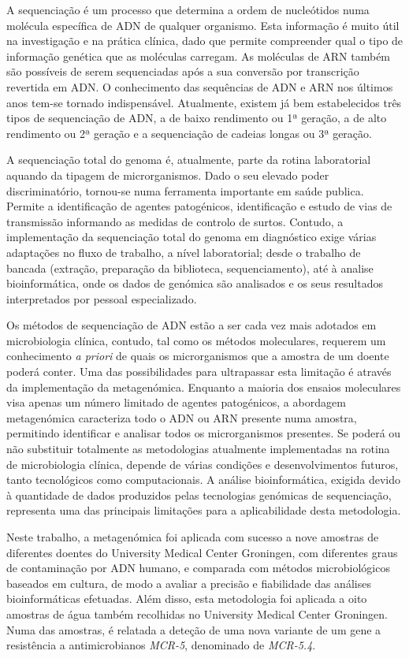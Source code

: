 A sequenciação é um processo que determina a ordem de nucleótidos numa molécula específica de ADN de qualquer organismo. Esta informação é muito útil na investigação e na prática clínica, dado que permite compreender qual o tipo de informação genética que as moléculas carregam. As moléculas de ARN também são possíveis de serem sequenciadas após a sua conversão por transcrição revertida em ADN. O conhecimento das sequências de ADN e ARN nos últimos anos tem-se tornado indispensável. Atualmente, existem já bem estabelecidos três tipos de sequenciação de ADN, a de baixo rendimento ou 1ª geração, a de alto rendimento ou 2ª geração e a sequenciação de cadeias longas ou 3ª geração.

A sequenciação total do genoma é, atualmente, parte da rotina laboratorial aquando da tipagem de microrganismos. Dado o seu elevado poder discriminatório, tornou-se numa ferramenta importante em saúde publica. Permite a identificação de agentes patogénicos, identificação e estudo de vias de transmissão informando as medidas de controlo de surtos. Contudo, a implementação da sequenciação total do genoma em diagnóstico exige várias adaptações no fluxo de trabalho, a nível laboratorial; desde o trabalho de bancada (extração, preparação da biblioteca, sequenciamento), até à analise bioinformática, onde os dados de genómica são analisados e os seus resultados interpretados por pessoal especializado.

Os métodos de sequenciação de ADN estão a ser cada vez mais adotados em microbiologia clínica, contudo, tal como os métodos moleculares, requerem um conhecimento \textit{a priori} de quais os microrganismos que a amostra de um doente poderá conter. Uma das possibilidades para ultrapassar esta limitação é através da implementação da metagenómica. Enquanto a maioria dos ensaios moleculares visa apenas um número limitado de agentes patogénicos, a abordagem metagenómica caracteriza todo o ADN ou ARN presente numa amostra, permitindo identificar e analisar todos os microrganismos presentes. Se poderá ou não substituir totalmente as metodologias atualmente implementadas na rotina de microbiologia clínica, depende de várias condições e desenvolvimentos futuros, tanto tecnológicos como computacionais. A análise bioinformática, exigida devido à quantidade de dados produzidos pelas tecnologias genómicas de sequenciação, representa uma das principais limitações para a aplicabilidade desta metodologia.

Neste trabalho, a metagenómica foi aplicada com sucesso a nove amostras de diferentes doentes do University Medical Center Groningen, com diferentes graus de contaminação por ADN humano, e comparada com métodos microbiológicos baseados em cultura, de modo a avaliar a precisão e fiabilidade das análises bioinformáticas efetuadas. Além disso, esta metodologia foi aplicada a oito amostras de água também recolhidas no University Medical Center Groningen. Numa das amostras, é relatada a deteção de uma nova variante de um gene a resistência a antimicrobianos \textit{MCR-5}, denominado de \textit{MCR-5.4}.

